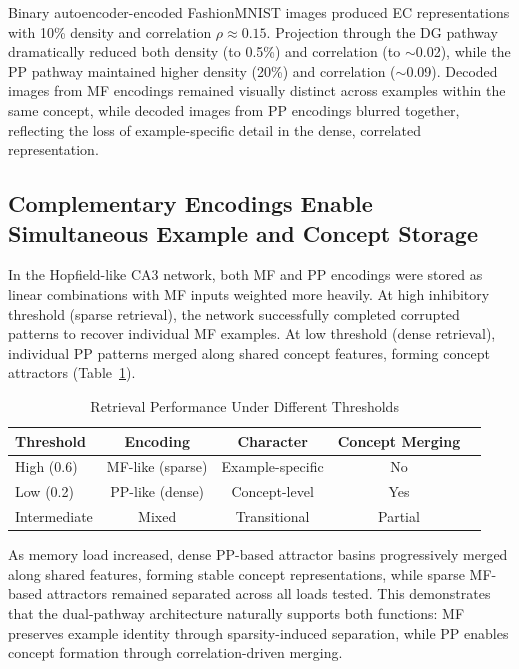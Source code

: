 \documentclass[11pt]{article}
\begin{document}
Binary autoencoder-encoded FashionMNIST images produced EC representations with 10\% density and correlation $\rho \approx 0.15$. Projection through the DG pathway dramatically reduced both density (to 0.5\%) and correlation (to $\sim$0.02), while the PP pathway maintained higher density (20\%) and correlation ($\sim$0.09). Decoded images from MF encodings remained visually distinct across examples within the same concept, while decoded images from PP encodings blurred together, reflecting the loss of example-specific detail in the dense, correlated representation.

\subsection{Complementary Encodings Enable Simultaneous Example and Concept Storage}

In the Hopfield-like CA3 network, both MF and PP encodings were stored as linear combinations with MF inputs weighted more heavily. At high inhibitory threshold (sparse retrieval), the network successfully completed corrupted patterns to recover individual MF examples. At low threshold (dense retrieval), individual PP patterns merged along shared concept features, forming concept attractors (Table~\ref{tab:retrieval}).

\begin{table}[ht]
\centering
\caption{Retrieval Performance Under Different Thresholds}
\label{tab:retrieval}
\begin{tabular}{lcccl}
\toprule
\textbf{Threshold} & \textbf{Encoding} & \textbf{Character} & \textbf{Concept Merging} \\
\midrule
High (0.6) & MF-like (sparse) & Example-specific & No \\
Low (0.2) & PP-like (dense) & Concept-level & Yes \\
Intermediate & Mixed & Transitional & Partial \\
\bottomrule
\end{tabular}
\end{table}

As memory load increased, dense PP-based attractor basins progressively merged along shared features, forming stable concept representations, while sparse MF-based attractors remained separated across all loads tested. This demonstrates that the dual-pathway architecture naturally supports both functions: MF preserves example identity through sparsity-induced separation, while PP enables concept formation through correlation-driven merging.
\end{document}
